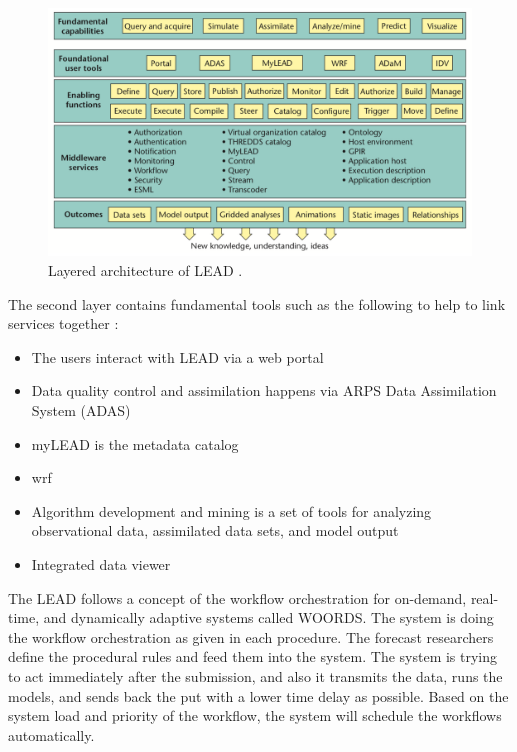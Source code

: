 \begin{figure}[htp]
    \centering
    \includegraphics[width=1.0\textwidth]{lit/lead/LEAD-system-Fundamental-capabilities-familiar-to-meteorologists-are-shown-in-the-top_W640.png}
    \caption[Layered architecture of LEAD]{Layered architecture of LEAD \cite{Droegemeier2005Service-orientedWeather}.}
    \label{fi:lead_system}
\end{figure}

The second layer contains fundamental tools such as the following to help to link services together \cite{Droegemeier2005Service-orientedWeather}:
\begin{itemize}
    \item The users interact with LEAD via a web portal
    \item Data quality control and assimilation happens via ARPS Data Assimilation System (ADAS)
    \item myLEAD is the metadata catalog
    \item \acrfull{wrf} \cite{MesoscaleMicroscaleMeteorologyLaboratoryWeatherModel}
    \item Algorithm development and mining is a set of tools for analyzing observational data, assimilated data sets, and model output
    \item Integrated data viewer 
\end{itemize}

The LEAD follows a concept of the workflow orchestration for on-demand, real-time, and dynamically adaptive systems called WOORDS. The system is doing the workflow orchestration as given in each procedure. The forecast researchers define the procedural rules and feed them into the system. The system is trying to act immediately after the submission, and also it transmits the data, runs the models, and sends back the put with a lower time delay as possible. Based on the system load and priority of the workflow, the system will schedule the workflows automatically.

